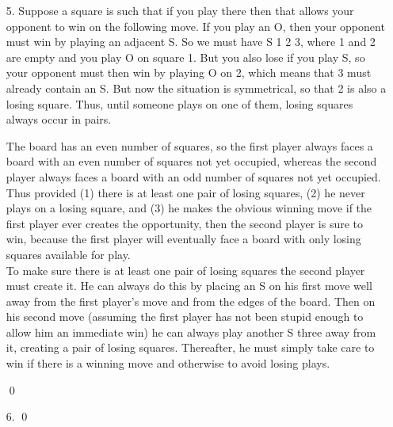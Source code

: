 \documentclass[a4paper, 12pt]{article}
\begin{document}
\begin{enumerate}
\qed


\vspace{5mm}

\item[5.]   Suppose a square is such that if you play there then that allows your opponent to win on the following move. If you play an O, then your opponent must win by playing an adjacent S. So we must have S 1 2 3, where 1 and 2 are empty and you play O on square 1. But you also lose if you play S, so your opponent must then win by playing O on 2, which means that 3 must already contain an S. But now the situation is symmetrical, so that 2 is also a losing square. Thus, until someone plays on one of them, losing squares always occur in pairs.

The board has an even number of squares, so the first player always faces a board with an even number of squares not yet occupied, whereas the second player always faces a board with an odd number of squares not yet occupied. Thus provided (1) there is at least one pair of losing squares, (2) he never plays on a losing square, and (3) he makes the obvious winning move if the first player ever creates the opportunity, then the second player is sure to win, because the first player will eventually face a board with only losing squares available for play. \\

To make sure there is at least one pair of losing squares the second player must create it. He can always do this by placing an S on his first move well away from the first player's move and from the edges of the board. Then on his second move (assuming the first player has not been stupid enough to allow him an immediate win) he can always play another S three away from it, creating a pair of losing squares. Thereafter, he must simply take care to win if there is a winning move and otherwise to avoid losing plays.

\qed



\item[6.]  \qed





    

\end{enumerate}
\end{document}
